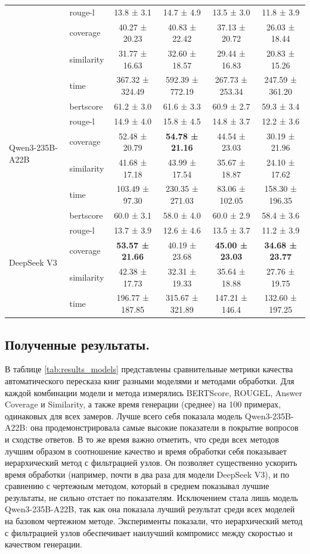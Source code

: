 \documentclass{article}
\begin{document}
\begin{table}[ht!]
\begin{tabular}{ll|c|c|c|c}
 & rouge-l   & 13.8 ± 3.1 & 14.7 ± 4.9 & 13.5 ± 3.0 & 11.8 ± 3.9 \\
 & coverage  & 40.27 ± 20.23 & 40.83 ± 22.42 & 37.13 ± 20.72 & 26.03 ± 18.44 \\
 & similarity& 31.77 ± 16.63 & 32.60 ± 18.57 & 29.44 ± 16.83 & 20.83 ± 15.26 \\
 & time      & 367.32 ± 324.49 & 592.39 ± 772.19 & 267.73 ± 253.34 & 247.59 ± 361.20 \\
 \midrule
\multirow{5}{*}{Qwen3-235B-A22B}
 & bertscore & 61.2 ± 3.0 & 61.6 ± 3.3 & 60.9 ± 2.7 & 59.3 ± 3.4 \\
 & rouge-l   & 14.9 ± 4.0 & 15.8 ± 4.5 & 14.8 ± 3.7 & 12.2 ± 3.6 \\
 & coverage  & 52.48 ± 20.79 & \textbf{54.78 ± 21.16} & 44.54 ± 23.03 & 30.19 ± 21.96 \\
 & similarity& 41.68 ± 17.18 & 43.99 ± 17.54 & 35.67 ± 18.87 & 24.10 ± 17.62 \\
 & time      & 103.49 ± 97.30 & 230.35 ± 271.03 & 83.06 ± 102.05 & 158.30 ± 196.35 \\
\midrule
\multirow{5}{*}{DeepSeek V3}
 & bertscore & 60.0 ± 3.1 & 58.0 ± 4.0 & 60.0 ± 2.9 & 58.4 ± 3.6 \\
 & rouge-l   & 13.7 ± 3.9 & 12.6 ± 4.6 & 13.5 ± 3.7 & 11.2 ± 3.9 \\
 & coverage  & \textbf{53.57 ± 21.66} & 40.19 ± 23.68 & \textbf{45.00 ± 23.03} & \textbf{34.68 ± 23.77} \\
 & similarity& 42.38 ± 17.73 & 32.31 ± 19.33 & 35.64 ± 18.88 & 27.76 ± 19.75 \\
 & time      & 196.77 ± 187.85 & 315.67 ± 321.89 & 147.21 ± 146.4 & 132.60 ± 197.25 \\
\bottomrule
\end{tabular}
\end{table}

\subsection*{Полученные результаты.}
В таблице \ref{tab:results_models} представлены сравнительные метрики качества автоматического пересказа книг разными моделями и методами обработки. Для каждой комбинации модели и метода измерялись BERTScore, ROUGEL, Answer Coverage и 
Similarity, а также время генерации (среднее) на 100 примерах, одинаковых для всех замеров. Лучше всего себя показала модель Qwen3-\allowbreak 235B-\allowbreak A22B: она продемонстрировала самые высокие показатели в покрытие вопросов и сходстве ответов.
В то же время важно отметить, что среди всех методов лучшим образом в соотношение качество и время обработки себя показывает иерархический метод с фильтрацией узлов. Он позволяет существенно ускорить время обработки (например, почти в два раза для модели DeepSeek V3), и по сравнению с 
чертежным методом, который в среднем показывал лучшие результаты, не сильно отстает по показателям. Исключением стала лишь модель Qwen3-\allowbreak 235B-\allowbreak A22B, так как она показала лучший результат среди всех моделей на базовом чертежном методе.
Эксперименты показали, что иерархический метод с фильтрацией узлов обеспечивает наилучший компромисс между скоростью и качеством генерации.
\end{document}
